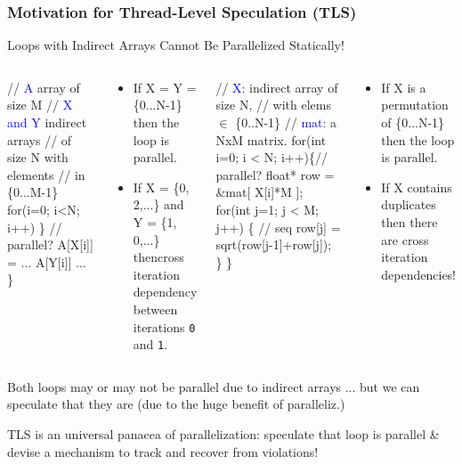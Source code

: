 \documentclass{beamer}
\newcommand{\blue}[1]{\textcolor{Blue}{{#1}}}
\newcommand{\emp}[1]{\textcolor{DikuRed}{ #1}}
\newcommand{\emphh}[1]{\textcolor{CosGreen}{ #1}}
\newcommand{\mymath}[1]{$ #1 $}
\begin{document}
\begin{frame}[fragile,t]
  \frametitle{Motivation for Thread-Level Speculation (TLS)}

\begin{block}{Loops with Indirect Arrays Cannot Be Parallelized Statically!}
\begin{columns}
\begin{colorcode}
// \blue{A} array of size M
// \blue{X and Y} indirect arrays
//   of size N with elements
//   in \{0...M-1\} 
for(i=0; i<N; i++) \} // \emphh{parallel?}
    A[X[i]] = ... A[Y[i]] ...
\}
\end{colorcode}
\begin{scriptsize}
\begin{itemize}
\item If X = Y = \{0...N-1\}\\\pause
        then the loop is parallel.
\item If X = \{0, 2,...\} and Y = \{1, 0,...\}
        then\pause {\tt~}cross
        iteration dependency between iterations
        {\tt 0} and {\tt 1}. 
\end{itemize}
\end{scriptsize}
\begin{colorcode}
// \blue{X}: indirect array of size N,
//   with elems \mymath{\in} \{0..N-1\}
// \blue{mat}: a NxM matrix. 
for(int i=0; i < N; i++)\{//\emphh{parallel?}
  float* row = &mat[ X[i]*M ];
  for(int j=1; j < M; j++) \{ //\emp{seq}
    row[j] = sqrt(row[j-1]+row[j]);
\} \}
\end{colorcode}
\begin{scriptsize}
\begin{itemize}
\item If X is a permutation of \{0...N-1\}\\\pause
        then the loop is parallel.
\item If X contains duplicates then there
        are cross iteration dependencies!
\end{itemize}
\end{scriptsize}
\end{columns}
\end{block} 

Both loops may or may not be parallel due to indirect
arrays ... but we can \alert{speculate} that they are 
(due to the huge benefit of paralleliz.)
\medskip

\emphh{TLS is an universal panacea of parallelization:
speculate that loop is parallel \& devise a mechanism
to track and recover from violations!}

\end{frame}
\end{document}

